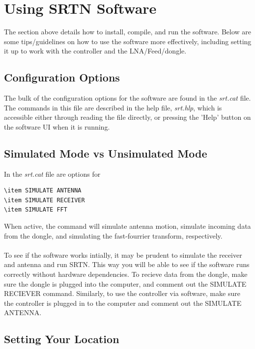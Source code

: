 \documentclass[11pt]{article} %
\begin{document}
\newpage
\section{Using SRTN Software}

The section above details how to install, compile, and run the software. Below are some tips/guidelines on how to use the software more effectively, including setting it up to work with the controller and the LNA/Feed/dongle.

\subsection{Configuration Options}

The bulk of the configuration options for the software are found in the \emph{srt.cat} file. The commands in this file are described in the help file, \emph{srt.hlp}, which is accessible either through reading the file directly, or pressing the 'Help' button on the software UI when it is running. 


\subsection{Simulated Mode vs Unsimulated Mode}

In the \emph{srt.cat} file are options for 

\begin{verbatim}
\item SIMULATE ANTENNA
\item SIMULATE RECEIVER
\item SIMULATE FFT
\end{verbatim}

When active, the command will simulate antenna motion, simulate incoming data from the dongle, and simulating the fast-fourrier transform, respectively. 
\\ \\
To see if the software works intially, it may be prudent to simulate the receiver and antenna and run SRTN. This way you will be able to see if the software runs correctly without hardware dependencies. To recieve data from the dongle, make sure the dongle is plugged into the computer, and comment out the SIMULATE RECIEVER command. Similarly, to use the controller via software, make sure the controller is plugged in to the computer and comment out the SIMULATE ANTENNA.

\subsection{Setting Your Location}
\end{document}
